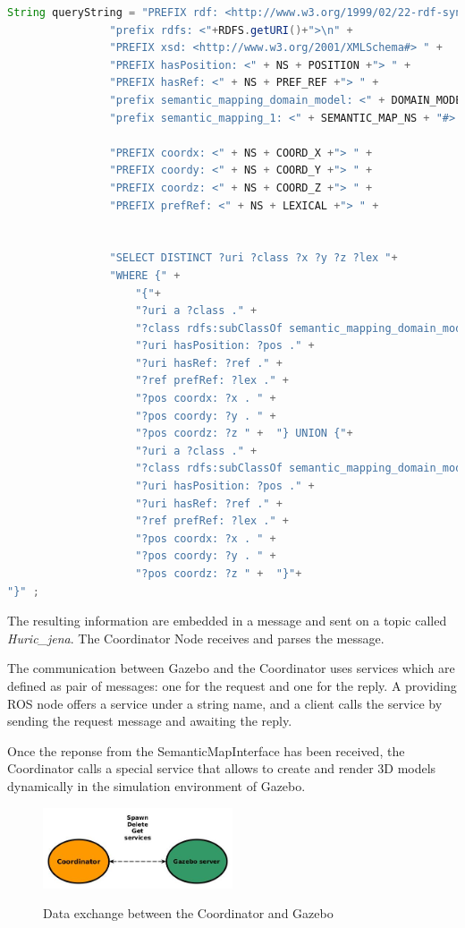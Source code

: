 \begin{lstlisting}[language=Java]
String queryString = "PREFIX rdf: <http://www.w3.org/1999/02/22-rdf-syntax-ns#>" +
				"prefix rdfs: <"+RDFS.getURI()+">\n" +
	    		"PREFIX xsd: <http://www.w3.org/2001/XMLSchema#> " +
	    		"PREFIX hasPosition: <" + NS + POSITION +"> " +
	    		"PREFIX hasRef: <" + NS + PREF_REF +"> " +
				"prefix semantic_mapping_domain_model: <" + DOMAIN_MODEL_NS + "#> \n"+
				"prefix semantic_mapping_1: <" + SEMANTIC_MAP_NS + "#> \n"+
	    		
	    		"PREFIX coordx: <" + NS + COORD_X +"> " +
	    		"PREFIX coordy: <" + NS + COORD_Y +"> " +
	    		"PREFIX coordz: <" + NS + COORD_Z +"> " +
	    		"PREFIX prefRef: <" + NS + LEXICAL +"> " +
	    		
	    		
	    		"SELECT DISTINCT ?uri ?class ?x ?y ?z ?lex "+
	    		"WHERE {" + 
	    			"{"+
		    		"?uri a ?class ." + 
		    		"?class rdfs:subClassOf semantic_mapping_domain_model:Furniture ."+
		    		"?uri hasPosition: ?pos ." + 
		    		"?uri hasRef: ?ref ." + 
		    		"?ref prefRef: ?lex ." + 
		    		"?pos coordx: ?x . " + 
		    		"?pos coordy: ?y . " + 
		    		"?pos coordz: ?z " +  "} UNION {"+
		    		"?uri a ?class ." + 
		    		"?class rdfs:subClassOf semantic_mapping_domain_model:Drink ." +
		    		"?uri hasPosition: ?pos ." + 
		    		"?uri hasRef: ?ref ." + 
		    		"?ref prefRef: ?lex ." + 
		    		"?pos coordx: ?x . " + 
		    		"?pos coordy: ?y . " + 
		    		"?pos coordz: ?z " +  "}"+
"}" ;
\end{lstlisting}
The resulting information are embedded in a message and sent on a topic called \textit{Huric\_jena}. The Coordinator Node receives and parses the message. 

The communication between Gazebo and the Coordinator uses services which are defined as pair of messages: one for the request and one for the reply. A providing ROS node offers a service under a string name, and a client calls the service by sending the request message and awaiting the reply.

Once the reponse from the SemanticMapInterface has been received, the Coordinator calls a special service that allows to create and render 3D models dynamically in the simulation environment of Gazebo.


\begin{figure}[H]
\centering
\includegraphics[width=0.5\textwidth]{imgs/gazebocoord.jpg}
\label{fig:actions}
\caption{Data exchange between the Coordinator and Gazebo}
\end{figure}



